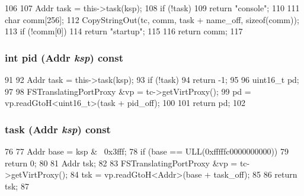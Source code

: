 \begin{DoxyCode}
106     {
107         Addr task = this->task(ksp);
108         if (!task)
109             return "console";
110 
111         char comm[256];
112         CopyStringOut(tc, comm, task + name_off, sizeof(comm));
113         if (!comm[0])
114             return "startup";
115 
116         return comm;
117     }
\end{DoxyCode}
\hypertarget{classX86ISA_1_1ProcessInfo_a27d14b3fdb576a4081e5c58c55375042}{
\subsubsection[{pid}]{\setlength{\rightskip}{0pt plus 5cm}int pid ({\bf Addr} {\em ksp}) const}}
\label{classX86ISA_1_1ProcessInfo_a27d14b3fdb576a4081e5c58c55375042}



\begin{DoxyCode}
91     {
92         Addr task = this->task(ksp);
93         if (!task)
94             return -1;
95 
96         uint16_t pd;
97 
98         FSTranslatingPortProxy &vp = tc->getVirtProxy();
99         pd = vp.readGtoH<uint16_t>(task + pid_off);
100 
101         return pd;
102     }
\end{DoxyCode}
\hypertarget{classX86ISA_1_1ProcessInfo_a05de971c556b8e4418a60289f92dfba3}{
\subsubsection[{task}]{ task ({\bf Addr} {\em ksp}) const}}
\label{classX86ISA_1_1ProcessInfo_a05de971c556b8e4418a60289f92dfba3}



\begin{DoxyCode}
76     {
77         Addr base = ksp & ~0x3fff;
78         if (base == ULL(0xfffffc0000000000))
79             return 0;
80 
81         Addr tsk;
82 
83         FSTranslatingPortProxy &vp = tc->getVirtProxy();
84         tsk = vp.readGtoH<Addr>(base + task_off);
85 
86         return tsk;
87     }
\end{DoxyCode}


